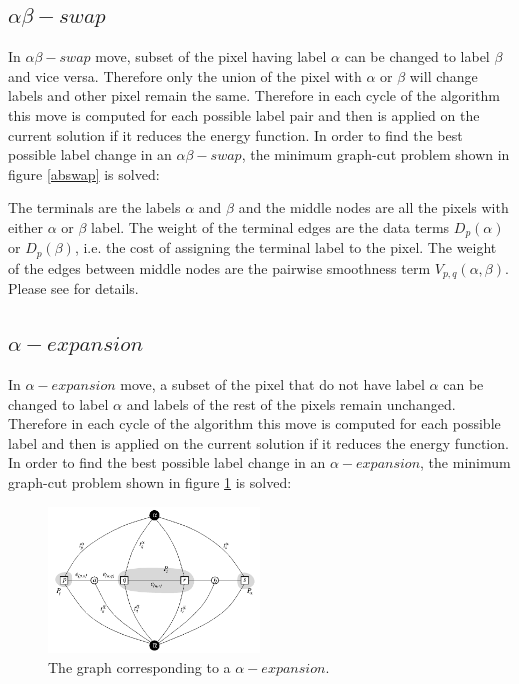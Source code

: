 \documentclass[letterpaper, 10 pt, conference]{ieeeconf}  %
\begin{document}
\subsection{$\alpha\beta-swap$} 
In $\alpha\beta-swap$ move, subset of the pixel having label $\alpha$ can be changed to label $\beta$ and vice versa. Therefore only the union of the pixel with $\alpha$ or $\beta$ will change labels and other pixel remain the same. Therefore in each cycle of the algorithm this move is computed for each possible label pair and then is applied on the current solution if it reduces the energy function. In order to find the best possible label change in an $\alpha\beta-swap$, the minimum graph-cut problem shown in figure \ref{abswap} is solved:

The terminals are the labels $\alpha$ and $\beta$ and the middle nodes are all the pixels with either $\alpha$ or $\beta$ label. The weight of the terminal edges are the data terms $D_p(\alpha)$ or $D_p(\beta)$, i.e. the cost of assigning the terminal label to the pixel. The weight of the edges between middle nodes are the pairwise smoothness term $V_{p,q}(\alpha,\beta)$. Please see \cite{boykov2001fast} for details.

\subsection{$\alpha-expansion$}
In $\alpha-expansion$ move, a subset of the pixel that do not have label $\alpha$ can be changed to label $\alpha$ and labels of the rest of the pixels remain unchanged. Therefore in each cycle of the algorithm this move is computed for each possible label and then is applied on the current solution if it reduces the energy function. In order to find the best possible label change in an $\alpha-expansion$, the minimum graph-cut problem shown in figure \ref{aexpansion} is solved:

\begin{figure}[h]
                \centering
                \includegraphics[width=0.5\textwidth]{imgs/expansion.png}
                \caption{The graph corresponding to a $\alpha-expansion$.}
                \label{aexpansion}
\end{figure}
\end{document}
